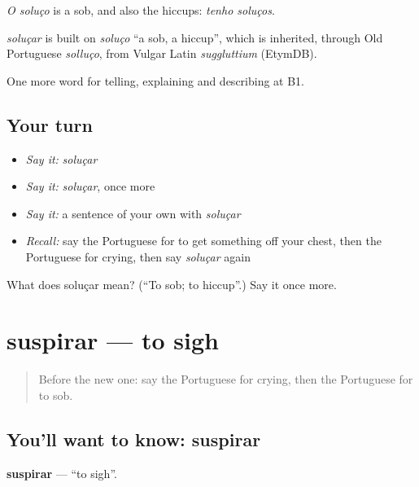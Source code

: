 \emph{O soluço} is a sob, and also the hiccups: \emph{tenho soluços}.

\begin{cousinweb}
\emph{soluçar} is built on \emph{soluço} \textquotedblleft{}a sob, a hiccup\textquotedblright{}, which is inherited, through Old Portuguese \emph{solluço}, from Vulgar Latin \emph{suggluttium} (EtymDB).
\end{cousinweb}

\begin{grammarlens}[title={What you've built}]
One more word for telling, explaining and describing at B1.
\end{grammarlens}

\subsection*{Your turn}
\begin{itemize}
\raggedright
  \item \emph{Say it:} \emph{soluçar}
  \item \emph{Say it:} \emph{soluçar}, once more
  \item \emph{Say it:} a sentence of your own with \emph{soluçar}
  \item \emph{Recall:} say the Portuguese for to get something off your chest, then the Portuguese for crying, then say \emph{soluçar} again
\end{itemize}

\begin{tcolorbox}[breakable,colback=teal!4,colframe=teal!35!black,title={Before you move on}]
What does soluçar mean? (\textquotedblleft{}To sob; to hiccup\textquotedblright{}.) Say it once more.
\end{tcolorbox}
\section[suspirar]{suspirar — to sigh}

\label{lesson:PT-C477-suspirar}



\begin{quote}
Before the new one: say the Portuguese for crying, then the Portuguese for to sob.
\end{quote}

\subsection*{You'll want to know: suspirar}
\textbf{suspirar} — \textquotedblleft{}to sigh\textquotedblright{}.

